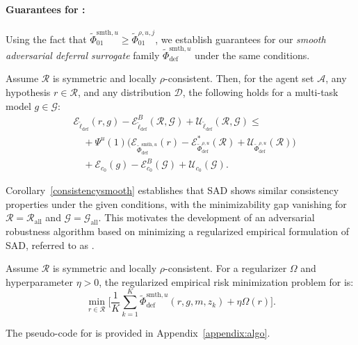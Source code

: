\paragraph{Guarantees for \name:} Using the fact that \( \widetilde{\Phi}^{\text{smth},u}_{01} \geq \widetilde{\Phi}^{\rho,u,j}_{01} \), we establish guarantees for our \textit{smooth adversarial deferral surrogate} family \( \widetilde{\Phi}^{\text{smth}, u}_{\text{def}} \) under the same conditions.
\begin{corollary} \label{consistencysmooth}
Assume \( \mathcal{R} \) is symmetric and locally \( \rho \)-consistent. Then, for the agent set \( \mathcal{A} \), any hypothesis \( r \in \mathcal{R} \), and any distribution \( \mathcal{D} \), the following holds for a multi-task model \( g \in \mathcal{G} \):
\begin{equation*}
    \begin{aligned}
        & \mathcal{E}_{\widetilde{\ell}_{\text{def}}}(r, g) - \mathcal{E}_{\widetilde{\ell}_{\text{def}}}^B(\mathcal{R}, \mathcal{G}) + \mathcal{U}_{\widetilde{\ell}_{\text{def}}}(\mathcal{R}, \mathcal{G}) \leq  \\
        & \quad + \Psi^u(1) \Big( \mathcal{E}_{\widetilde{\Phi}^{\text{smth}, u}_{\text{def}}}(r) - \mathcal{E}_{\widetilde{\Phi}^{\rho, u}_{\text{def}}}^\ast(\mathcal{R}) + \mathcal{U}_{\widetilde{\Phi}^{\rho, u}_{\text{def}}}(\mathcal{R}) \Big) \\
        & \quad + \mathcal{E}_{c_0}(g) - \mathcal{E}_{c_0}^B(\mathcal{G}) + \mathcal{U}_{c_0}(\mathcal{G}).
    \end{aligned}
\end{equation*}
\end{corollary}

Corollary~\ref{consistencysmooth} establishes that SAD shows similar consistency properties under the given conditions, with the minimizability gap vanishing for \( \mathcal{R} = \mathcal{R}_{\text{all}} \) and \( \mathcal{G} = \mathcal{G}_{\text{all}} \). This motivates the development of an adversarial robustness algorithm based on minimizing a regularized empirical formulation of SAD, referred to as \name{}.

\begin{proposition} \label{radvl2d}
Assume \( \mathcal{R} \) is symmetric and locally \( \rho \)-consistent. For a regularizer \( \Omega \) and hyperparameter \( \eta > 0 \), the regularized empirical risk minimization problem for \name{} is:
\[
\min_{r \in \mathcal{R}} \Bigg[ \frac{1}{K}\sum_{k=1}^K \widetilde{\Phi}^{\text{smth}, u}_{\text{def}}(r, g, m, z_k) + \eta \Omega(r) \Bigg].
\]
\end{proposition}

The pseudo-code for \name{} is provided in Appendix~\ref{appendix:algo}.


